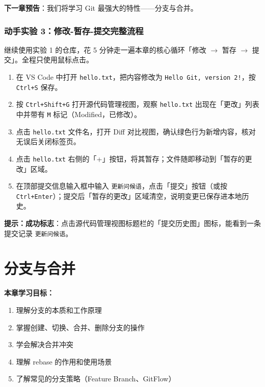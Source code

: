 \documentclass[12pt,a4paper,openany]{ctexbook}
\begin{document}
\textbf{下一章预告}：我们将学习 Git 最强大的特性——分支与合并。

\subsection*{动手实验 3：修改-暂存-提交完整流程}

继续使用实验 1 的仓库，花 5 分钟走一遍本章的核心循环「修改 $\to$ 暂存 $\to$ 提交」。全程只使用鼠标点击。

\medskip
\begin{enumerate}[leftmargin=1.5em]
  \item 在 VS Code 中打开 \texttt{hello.txt}，把内容修改为 \texttt{Hello Git, version 2!}，按 \texttt{Ctrl+S} 保存。
  \item 按 \texttt{Ctrl+Shift+G} 打开源代码管理视图，观察 \texttt{hello.txt} 出现在「更改」列表中并带有 \texttt{M} 标记（Modified，已修改）。
  \item 点击 \texttt{hello.txt} 文件名，打开 Diff 对比视图，确认绿色行为新增内容，核对无误后关闭标签页。
  \item 点击 \texttt{hello.txt} 右侧的「+」按钮，将其暂存；文件随即移动到「暂存的更改」区域。
  \item 在顶部提交信息输入框中输入 \texttt{更新问候语}，点击「提交」按钮（或按 \texttt{Ctrl+Enter}）；提交后「暂存的更改」区域清空，说明变更已保存进本地历史。
\end{enumerate}
\medskip

\noindent\textbf{提示：}\textbf{成功标志}：点击源代码管理视图标题栏的「提交历史图」图标，能看到一条提交记录 \texttt{更新问候语}。
\medskip

\chapter{分支与合并}

\medskip
\noindent\textbf{本章学习目标：}
\begin{enumerate}[leftmargin=1.5em]
  \item 理解分支的本质和工作原理
  \item 掌握创建、切换、合并、删除分支的操作
  \item 学会解决合并冲突
  \item 理解 rebase 的作用和使用场景
  \item 了解常见的分支策略（Feature Branch、GitFlow）
\end{enumerate}
\medskip
\end{document}
